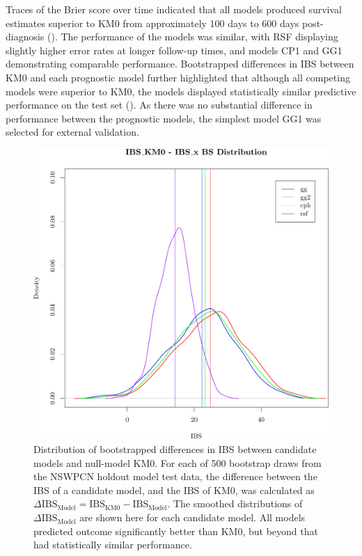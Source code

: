 \documentclass[dissertation.tex]{subfiles}
\begin{document}
Traces of the Brier score over time indicated that all models produced survival estimates superior to KM0 from approximately 100 days to 600 days post-diagnosis ().  The performance of the models was similar, with RSF displaying slightly higher error rates at longer follow-up times, and models CP1 and GG1 demonstrating comparable performance.  Bootstrapped differences in \gls{IBS} between KM0 and each prognostic model further highlighted that although all competing models were superior to KM0, the models displayed statistically similar predictive performance on the test set ().  As there was no substantial difference in performance between the prognostic models, the simplest model GG1 was selected for external validation.

\begin{figure}
\centering
  \includegraphics[width=.7\linewidth]{analysis/nomogram/figure/05-model-selection-ibs-3}
  \caption[Bootstrapped differences in \acrshort{IBS} between candidate models and KM0]{Distribution of bootstrapped differences in \gls{IBS} between candidate models and null-model KM0.  For each of 500 bootstrap draws from the \gls{NSWPCN} holdout model test data, the difference between the \gls{IBS} of a candidate model, and the \gls{IBS} of KM0, was calculated as $\Delta \mbox{IBS}_{\mbox{Model}} = \mbox{IBS}_{\mbox{KM0}} - \mbox{IBS}_{\mbox{Model}}$.  The smoothed distributions of $\Delta \mbox{IBS}_{\mbox{Model}}$ are shown here for each candidate model.  All models predicted outcome significantly better than KM0, but beyond that had statistically similar performance.}
\label{fig:nomo-ibs-delta}
\end{figure}
\end{document}
